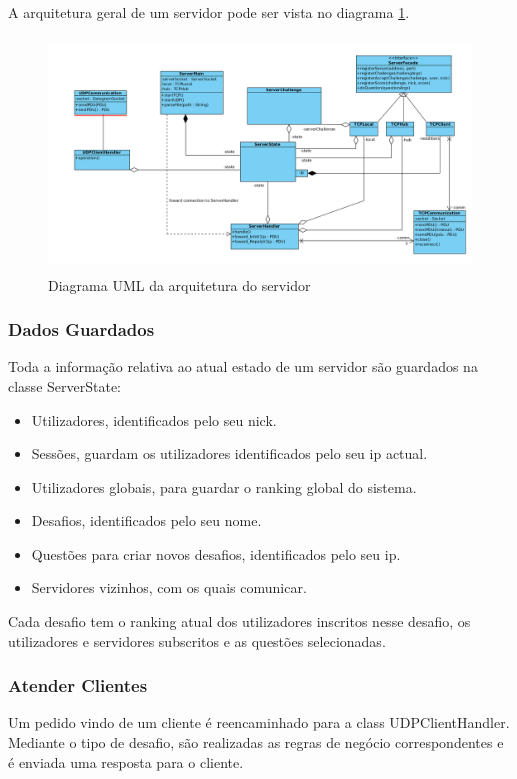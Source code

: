 \documentclass[runningheads,a4paper]{llncs}
\begin{document}
A arquitetura geral de um servidor pode ser vista no diagrama \ref{fig:diagram-arq-geral}.

\begin{figure}
\centering
\includegraphics[height=6.2cm]{arq-geral.png}
\caption{Diagrama UML da arquitetura do servidor}
\label{fig:diagram-arq-geral}
\end{figure}


\subsubsection{Dados Guardados}

Toda a informação relativa ao atual estado de um servidor são guardados na classe ServerState:
\begin{itemize}
  \item Utilizadores, identificados pelo seu nick.
  \item Sessões, guardam os utilizadores identificados pelo seu ip actual.
  \item Utilizadores globais, para guardar o ranking global do sistema.
  \item Desafios, identificados pelo seu nome.
  \item Questões para criar novos desafios, identificados pelo seu ip.
  \item Servidores vizinhos, com os quais comunicar.
\end{itemize}

Cada desafio tem o ranking atual dos utilizadores inscritos nesse desafio, os utilizadores e servidores subscritos e as questões selecionadas.

\subsubsection{Atender Clientes}

Um pedido vindo de um cliente é reencaminhado para a class UDPClientHandler. Mediante o tipo de desafio, são realizadas as regras de negócio correspondentes e é enviada uma resposta para o cliente.
\end{document}
